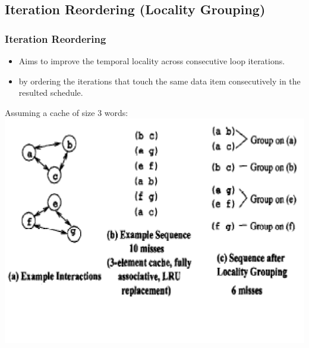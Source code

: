 \documentclass{beamer}
\newcommand{\emphh}[1]{\textcolor{CosGreen}{ #1}}
\begin{document}
\subsection{Iteration Reordering (Locality Grouping)}


\begin{frame}[fragile,t]
  \frametitle{Iteration Reordering}

\begin{itemize}
    \item Aims to improve the \emphh{temporal locality} across 
            consecutive loop iterations.
    \item by ordering the iterations that touch the same
            data item consecutively in the resulted schedule.
\end  {itemize}

Assuming a cache of size 3 words:
\includegraphics[width=54ex]{Figures/CacheMissesEg2}
 
\end{frame}
\end{document}
